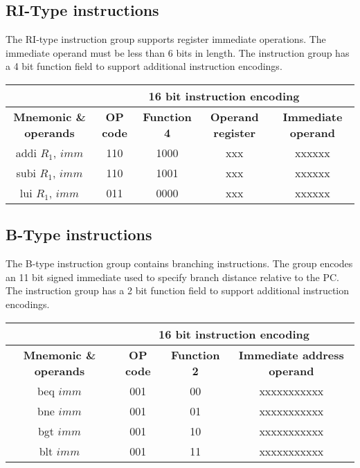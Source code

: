 \documentclass{article}
\begin{document}
\begin{par}
	\subsection{RI-Type instructions}
	The RI-type instruction group supports register immediate operations. The immediate operand must be less than 6 bits in length. The instruction group has a 4 bit function field to support additional instruction encodings. 
	\begin{center}
		\begin{tabular}{|c|c|c|c|c|c|}
			\hline 
			& \multicolumn{5}{|c|}{\textbf{16 bit instruction encoding}} \\ 
			\hline
			\textbf{Mnemonic \& operands} & \textbf{OP code} & \textbf{Function 4} & \textbf{Operand register} & \multicolumn{2}{|c|}{\textbf{Immediate operand}} \\
			\hline 
			addi $ R_{1} $, $ imm $ & 110 & 1000 & xxx & \multicolumn{2}{|c|}{xxxxxx} \\ 
			\hline 
			subi $ R_{1} $, $ imm $ & 110 & 1001 & xxx & \multicolumn{2}{|c|}{xxxxxx} \\ 
			\hline 
			lui $ R_{1} $, $ imm $ & 011 & 0000 & xxx & \multicolumn{2}{|c|}{xxxxxx} \\ 
			\hline 
		\end{tabular} 
	\end{center}

	\newpage

	\subsection{B-Type instructions}
	The B-type instruction group contains branching instructions. The group encodes an 11 bit signed immediate used to specify branch distance relative to the PC. The instruction group has a 2 bit function field to support additional instruction encodings. 
	\begin{center}
		\begin{tabular}{|c|c|c|c|c|c|}
			\hline 
			& \multicolumn{5}{|c|}{\textbf{16 bit instruction encoding}} \\ 
			\hline
			\textbf{Mnemonic \& operands} & \textbf{OP code} & \textbf{Function 2} & \multicolumn{3}{|c|}{\textbf{Immediate address operand}} \\
			\hline 
			beq $ imm $ & 001 & 00 & \multicolumn{3}{|c|}{xxxxxxxxxxx} \\ 
			\hline 
			bne $ imm $ & 001 & 01 & \multicolumn{3}{|c|}{xxxxxxxxxxx} \\ 
			\hline 
			bgt $ imm $ & 001 & 10 & \multicolumn{3}{|c|}{xxxxxxxxxxx} \\ 
			\hline 
			blt $ imm $ & 001 & 11 & \multicolumn{3}{|c|}{xxxxxxxxxxx} \\ 
			\hline 
		\end{tabular}
	\end{center}


\end{par}
\end{document}
